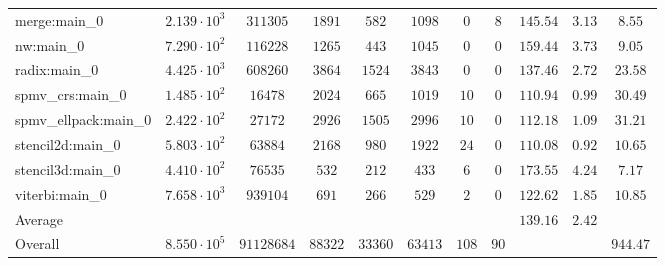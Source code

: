 \begin{tabular}{|l|c|c|c|c|c|c|c|c|c|c|}
merge:main\_0          & $ 2.139 \cdot 10^{3} $ & $ 311305   $ & $ 1891  $ & $ 582   $ & $ 1098  $ & $ 0   $ & $ 8  $ & $ 145.54      $ & $ 3.13    $ & $ 8.55    $ \\
nw:main\_0             & $ 7.290 \cdot 10^{2} $ & $ 116228   $ & $ 1265  $ & $ 443   $ & $ 1045  $ & $ 0   $ & $ 0  $ & $ 159.44      $ & $ 3.73    $ & $ 9.05    $ \\
radix:main\_0          & $ 4.425 \cdot 10^{3} $ & $ 608260   $ & $ 3864  $ & $ 1524  $ & $ 3843  $ & $ 0   $ & $ 0  $ & $ 137.46      $ & $ 2.72    $ & $ 23.58   $ \\
spmv\_crs:main\_0      & $ 1.485 \cdot 10^{2} $ & $ 16478    $ & $ 2024  $ & $ 665   $ & $ 1019  $ & $ 10  $ & $ 0  $ & $ 110.94      $ & $ 0.99    $ & $ 30.49   $ \\
spmv\_ellpack:main\_0  & $ 2.422 \cdot 10^{2} $ & $ 27172    $ & $ 2926  $ & $ 1505  $ & $ 2996  $ & $ 10  $ & $ 0  $ & $ 112.18      $ & $ 1.09    $ & $ 31.21   $ \\
stencil2d:main\_0      & $ 5.803 \cdot 10^{2} $ & $ 63884    $ & $ 2168  $ & $ 980   $ & $ 1922  $ & $ 24  $ & $ 0  $ & $ 110.08      $ & $ 0.92    $ & $ 10.65   $ \\
stencil3d:main\_0      & $ 4.410 \cdot 10^{2} $ & $ 76535    $ & $ 532   $ & $ 212   $ & $ 433   $ & $ 6   $ & $ 0  $ & $ 173.55      $ & $ 4.24    $ & $ 7.17    $ \\
viterbi:main\_0        & $ 7.658 \cdot 10^{3} $ & $ 939104   $ & $ 691   $ & $ 266   $ & $ 529   $ & $ 2   $ & $ 0  $ & $ 122.62      $ & $ 1.85    $ & $ 10.85   $ \\
\hline
Average                & $                    $ & $          $ & $       $ & $       $ & $       $ & $     $ & $    $ & $ 139.16      $ & $ 2.42    $ & $         $ \\
\hline
Overall                & $ 8.550 \cdot 10^{5} $ & $ 91128684 $ & $ 88322 $ & $ 33360 $ & $ 63413 $ & $ 108 $ & $ 90 $ & $             $ & $         $ & $ 944.47  $ \\
\hline
\end{tabular}

